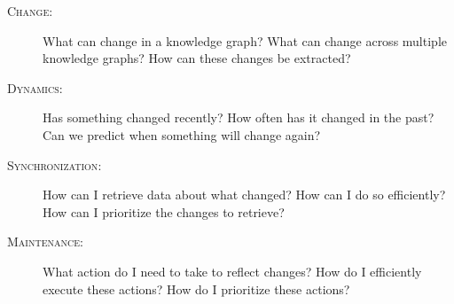 \documentclass[sw]{iosart2x}
\begin{document}
\begin{description}
\item[\textsc{Change}:] What can change in a knowledge graph? What can change across multiple knowledge graphs? How can these changes be extracted? 
\item[\textsc{Dynamics}:] Has something changed recently? How often has it changed in the past? Can we predict when something will change again?
\item[\textsc{Synchronization}:] How can I retrieve data about what changed? How can I do so efficiently? How can I prioritize the changes to retrieve?
\item[\textsc{Maintenance}:] What action do I need to take to reflect changes? How do I efficiently execute these actions? How do I prioritize these actions?
\end{description}
\end{document}
